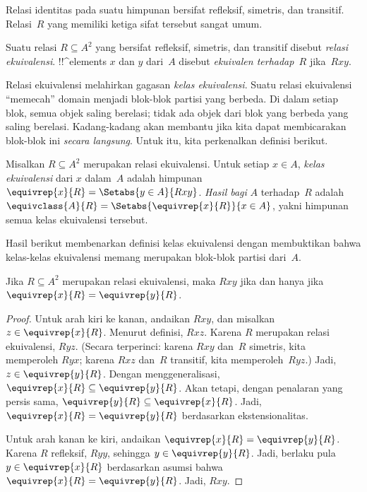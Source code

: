 \documentclass[../../../include/open-logic-section]{subfiles}
\begin{document}


Relasi identitas pada suatu himpunan bersifat refleksif, simetris, dan
transitif. Relasi~$R$ yang memiliki ketiga sifat tersebut sangat umum.

\begin{defn}
Suatu relasi $R \subseteq A^2$ yang bersifat refleksif, simetris, dan transitif
disebut \emph{relasi ekuivalensi}. !!^{element}s $x$ dan $y$ dari~$A$ disebut
\emph{ekuivalen terhadap~$R$} jika~$Rxy$.
\end{defn}

Relasi ekuivalensi melahirkan gagasan \emph{kelas ekuivalensi}. Suatu relasi
ekuivalensi ``memecah'' domain menjadi blok-blok partisi yang berbeda. Di dalam
setiap blok, semua objek saling berelasi; tidak ada objek dari blok yang
berbeda yang saling berelasi. Kadang-kadang akan membantu jika kita dapat
membicarakan blok-blok ini \emph{secara langsung}. Untuk itu, kita perkenalkan
definisi berikut.

\begin{defn}
Misalkan $R \subseteq A^2$ merupakan relasi ekuivalensi. Untuk setiap $x \in
A$, \emph{kelas ekuivalensi} dari $x$ dalam~$A$ adalah himpunan
$\equivrep{x}{R} = \Setabs{y \in A}{Rxy}$. \emph{Hasil bagi} $A$ terhadap~$R$
adalah $\equivclass{A}{R} = \Setabs{\equivrep{x}{R}}{x \in A}$, yakni himpunan
semua kelas ekuivalensi tersebut.
\end{defn}

Hasil berikut membenarkan definisi kelas ekuivalensi dengan membuktikan bahwa
kelas-kelas ekuivalensi memang merupakan blok-blok partisi dari~$A$.

\begin{prop}
Jika $R \subseteq A^2$ merupakan relasi ekuivalensi, maka $Rxy$ jika dan hanya
jika $\equivrep{x}{R} = \equivrep{y}{R}$.
\end{prop}

\begin{proof}
Untuk arah kiri ke kanan, andaikan $Rxy$, dan misalkan $z \in
\equivrep{x}{R}$. Menurut definisi, $Rxz$. Karena $R$ merupakan relasi
ekuivalensi, $Ryz$. (Secara terperinci: karena $Rxy$ dan~$R$ simetris, kita
memperoleh $Ryx$; karena $Rxz$ dan~$R$ transitif, kita memperoleh~$Ryz$.) Jadi,
$z \in \equivrep{y}{R}$. Dengan menggeneralisasi,
$\equivrep{x}{R} \subseteq \equivrep{y}{R}$. Akan tetapi, dengan penalaran yang
persis sama, $\equivrep{y}{R} \subseteq \equivrep{x}{R}$. Jadi,
$\equivrep{x}{R} = \equivrep{y}{R}$ berdasarkan ekstensionalitas.

Untuk arah kanan ke kiri, andaikan $\equivrep{x}{R} = \equivrep{y}{R}$. Karena
$R$ refleksif, $Ryy$, sehingga $y \in \equivrep{y}{R}$. Jadi, berlaku pula
$y \in \equivrep{x}{R}$ berdasarkan asumsi bahwa
$\equivrep{x}{R} = \equivrep{y}{R}$.
Jadi, $Rxy$.
\end{proof}
\end{document}
